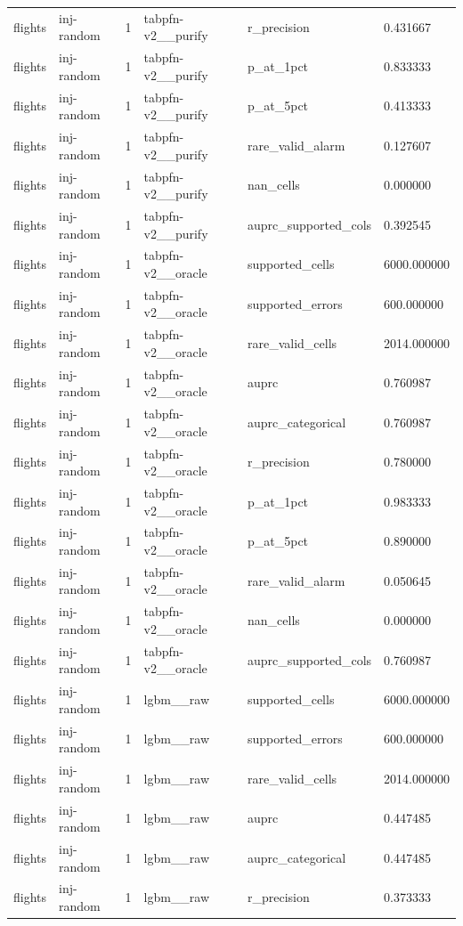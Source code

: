 \begin{tabular}{llllll}
flights & inj-random & 1 & tabpfn-v2\_\_purify & r\_precision & 0.431667 \\
flights & inj-random & 1 & tabpfn-v2\_\_purify & p\_at\_1pct & 0.833333 \\
flights & inj-random & 1 & tabpfn-v2\_\_purify & p\_at\_5pct & 0.413333 \\
flights & inj-random & 1 & tabpfn-v2\_\_purify & rare\_valid\_alarm & 0.127607 \\
flights & inj-random & 1 & tabpfn-v2\_\_purify & nan\_cells & 0.000000 \\
flights & inj-random & 1 & tabpfn-v2\_\_purify & auprc\_supported\_cols & 0.392545 \\
flights & inj-random & 1 & tabpfn-v2\_\_oracle & supported\_cells & 6000.000000 \\
flights & inj-random & 1 & tabpfn-v2\_\_oracle & supported\_errors & 600.000000 \\
flights & inj-random & 1 & tabpfn-v2\_\_oracle & rare\_valid\_cells & 2014.000000 \\
flights & inj-random & 1 & tabpfn-v2\_\_oracle & auprc & 0.760987 \\
flights & inj-random & 1 & tabpfn-v2\_\_oracle & auprc\_categorical & 0.760987 \\
flights & inj-random & 1 & tabpfn-v2\_\_oracle & r\_precision & 0.780000 \\
flights & inj-random & 1 & tabpfn-v2\_\_oracle & p\_at\_1pct & 0.983333 \\
flights & inj-random & 1 & tabpfn-v2\_\_oracle & p\_at\_5pct & 0.890000 \\
flights & inj-random & 1 & tabpfn-v2\_\_oracle & rare\_valid\_alarm & 0.050645 \\
flights & inj-random & 1 & tabpfn-v2\_\_oracle & nan\_cells & 0.000000 \\
flights & inj-random & 1 & tabpfn-v2\_\_oracle & auprc\_supported\_cols & 0.760987 \\
flights & inj-random & 1 & lgbm\_\_raw & supported\_cells & 6000.000000 \\
flights & inj-random & 1 & lgbm\_\_raw & supported\_errors & 600.000000 \\
flights & inj-random & 1 & lgbm\_\_raw & rare\_valid\_cells & 2014.000000 \\
flights & inj-random & 1 & lgbm\_\_raw & auprc & 0.447485 \\
flights & inj-random & 1 & lgbm\_\_raw & auprc\_categorical & 0.447485 \\
flights & inj-random & 1 & lgbm\_\_raw & r\_precision & 0.373333 \\

\end{tabular}
